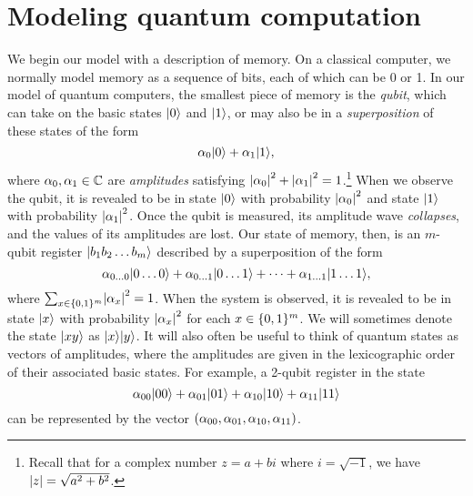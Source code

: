\documentclass[12pt]{article}
\begin{document}
\section{Modeling quantum computation}
We begin our model with a description of memory. On a classical computer, we
normally model memory as a sequence of bits, each of which can be 0 or 1. In
our model of quantum computers, the smallest piece of memory is the
\emph{qubit}, which can take on the basic states $\qz$ and $\qo$, or may also be
in a \emph{superposition} of these states of the form
$$
  \alpha_0\qz + \alpha_1\qo,
$$
where $\alpha_0, \alpha_1 \in \CC$ are \emph{amplitudes} satisfying
$\abs*{\alpha_0}^2 + \abs*{\alpha_1}^2 = 1$.\footnote{Recall that for a complex
number $z = a + bi$ where $i=\sqrt{-1}$, we have $\abs*{z} = \sqrt{a^2+b^2}$.}
When we observe the qubit, it is revealed to be in state $\qz$ with probability
$\abs*{\alpha_0}^2$ and state $\qo$ with probability $\abs*{\alpha_1}^2$. Once
the qubit is measured, its amplitude wave \emph{collapses}, and the values of
its amplitudes are lost. Our state of memory, then, is an $m$-qubit register
$\reg*{b_1 b_2 \dots b_m}$ described by a superposition of the form
$$
  \alpha_{0\dots 0}\reg*{0\dots 0}
  + \alpha_{0\dots 1}\reg*{0\dots 1}
  + \dots
  + \alpha_{1\dots 1} \reg*{1\dots 1},
$$
where $\sum_{x \in \zo^m} \abs*{\alpha_x}^2 = 1$. When the system is observed,
it is revealed to be in state $\reg*{x}$ with probability $\abs*{\alpha_x}^2$
for each $x \in \zo^m$. We will sometimes denote the state $\reg*{xy}$ as
$\reg*{x}\reg*{y}$. It will also often be useful to think of quantum states as
vectors of amplitudes, where the amplitudes are given in the lexicographic order
of their associated basic states. For example, a 2-qubit register in the state
$$
  \alpha_{00} \reg*{00}
  + \alpha_{01} \reg*{01}
  + \alpha_{10} \reg*{10}
  + \alpha_{11} \reg*{11}
$$
can be represented by the vector $\paren*{\alpha_{00}, \alpha_{01}, \alpha_{10},
\alpha_{11}}$.
\end{document}
